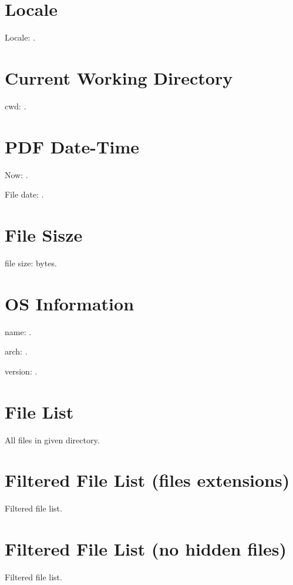 \documentclass{article}
\begin{document}
\section{Locale}

\TeXOSQueryLocale{\result}
Locale: \texttt{\result}.

\section{Current Working Directory}

\TeXOSQueryCwd{\result}
cwd: \texttt{\result}.

\section{PDF Date-Time}
\TeXOSQueryNow{\result}
Now: \texttt{\result}.

File date: \texttt{\result}.

\section{File Sisze}

file size: \result bytes.

\section{OS Information}

\TeXOSQueryName{\result}
name: \result.

\TeXOSQueryArch{\result}
arch: \result.

\TeXOSQueryVersion{\result}
version: \texttt{\result}.

\section{File List}

All files in given directory.

\renewcommand{\do}[1]{\texttt{#1}.\par}

\expandafter\docsvlist\expandafter{\result}

\section{Filtered File List (files extensions)}

Filtered file list.

\expandafter\docsvlist\expandafter{\result}

\section{Filtered File List (no hidden files)}

Filtered file list.

\expandafter\docsvlist\expandafter{\result}
\end{document}

